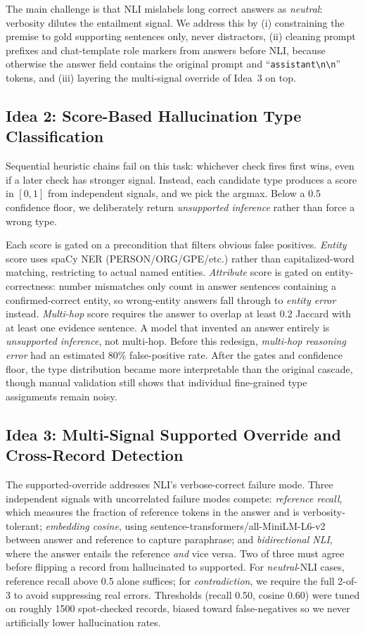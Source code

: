 \documentclass[11pt,a4paper]{article}
\newcommand{\lbl}[1]{\textit{#1}}
\begin{document}
The main challenge is that NLI mislabels long correct answers as \lbl{neutral}: verbosity dilutes the entailment signal. We address this by (i) constraining the premise to gold supporting sentences only, never distractors, (ii) cleaning prompt prefixes and chat-template role markers from answers before NLI, because otherwise the answer field contains the original prompt and ``\texttt{assistant\textbackslash n\textbackslash n}'' tokens, and (iii) layering the multi-signal override of Idea~3 on top.

\subsection{Idea 2: Score-Based Hallucination Type Classification}

Sequential heuristic chains fail on this task: whichever check fires first wins, even if a later check has stronger signal. Instead, each candidate type produces a score in $[0, 1]$ from independent signals, and we pick the argmax. Below a 0.5 confidence floor, we deliberately return \lbl{unsupported inference} rather than force a wrong type.

Each score is gated on a precondition that filters obvious false positives. \textit{Entity} score uses spaCy NER (PERSON/ORG/GPE/etc.) rather than capitalized-word matching, restricting to actual named entities. \textit{Attribute} score is gated on entity-correctness: number mismatches only count in answer sentences containing a confirmed-correct entity, so wrong-entity answers fall through to \lbl{entity error} instead. \textit{Multi-hop} score requires the answer to overlap at least 0.2 Jaccard with at least one evidence sentence. A model that invented an answer entirely is \lbl{unsupported inference}, not multi-hop. Before this redesign, \lbl{multi-hop reasoning error} had an estimated 80\% false-positive rate. After the gates and confidence floor, the type distribution became more interpretable than the original cascade, though manual validation still shows that individual fine-grained type assignments remain noisy.

\subsection{Idea 3: Multi-Signal Supported Override and Cross-Record Detection}

The supported-override addresses NLI's verbose-correct failure mode. Three independent signals with uncorrelated failure modes compete: \textit{reference recall}, which measures the fraction of reference tokens in the answer and is verbosity-tolerant; \textit{embedding cosine}, using sentence-transformers/all-MiniLM-L6-v2 between answer and reference to capture paraphrase; and \textit{bidirectional NLI}, where the answer entails the reference \textit{and} vice versa. Two of three must agree before flipping a record from hallucinated to supported. For \lbl{neutral}-NLI cases, reference recall above 0.5 alone suffices; for \lbl{contradiction}, we require the full 2-of-3 to avoid suppressing real errors. Thresholds (recall 0.50, cosine 0.60) were tuned on roughly 1500 spot-checked records, biased toward false-negatives so we never artificially lower hallucination rates.
\end{document}
